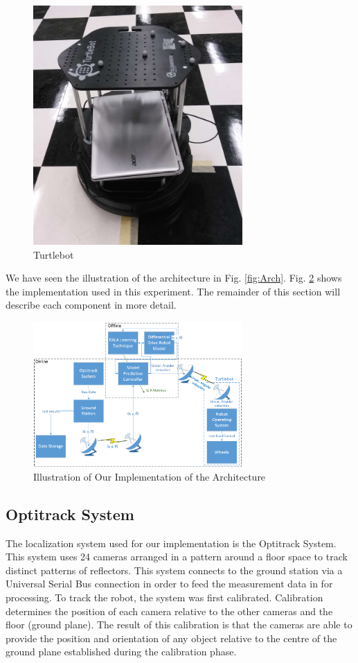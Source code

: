 \documentclass[conference]{IEEEtran}
\begin{document}
\begin{figure}[tb]
\centering
\includegraphics[width=80mm]{Turtle.PNG}
\caption{Turtlebot}
\label{fig:Turtle}
\end{figure} 

 We have seen the illustration of the architecture in Fig. \ref{fig:Arch}. Fig. \ref{fig:Impl} shows the implementation used in this experiment. The remainder of this section will describe each component in more detail.
 
\begin{figure}[tb]
\centering
\includegraphics[width=80mm]{Impl.PNG}
\caption{Illustration of Our Implementation of the Architecture}
\label{fig:Impl}
\end{figure} 

\subsection{Optitrack System}
The localization system used for our implementation is the Optitrack System. This system uses 24 cameras arranged in a pattern around a floor space to track distinct patterns of reflectors. This system connects to the ground station via a Universal Serial Bus connection in order to feed the measurement data in for processing. 
To track the robot, the system was first calibrated. Calibration determines the position of each camera relative to the other cameras and the floor (ground plane). The result of this calibration is that the cameras are able to provide the position and orientation of any object relative to the centre of the ground plane established during the calibration phase.
\end{document}
